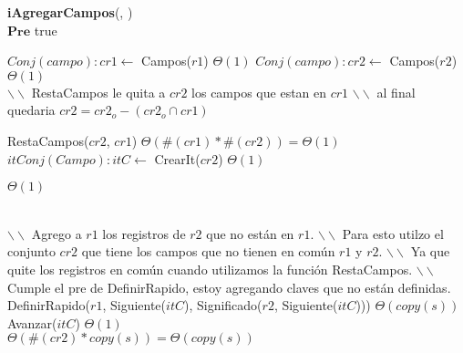\begin{algorithm}[H]{{\textbf{iAgregarCampos}(, )}}
	{\\ $\textbf{Pre}$ true}
    	\begin{algorithmic}[1]

    		\State $Conj(campo): cr1 \gets$ Campos($r1$) \Comment $\Theta(1)$
    		\State $Conj(campo): cr2 \gets$ Campos($r2$) \Comment $\Theta(1)$
    		\\

			\State $\backslash\backslash$ RestaCampos le quita a $cr2$ los campos que estan en $cr1$
			\State $\backslash\backslash$ al final quedaria $cr2 = cr2_o - (cr2_o \cap cr1)$

    		\State RestaCampos($cr2$, $cr1$) \Comment $\Theta(\#(cr1) * \#(cr2)) = \Theta(1)$
    		\\

    		\State $itConj(Campo): itC \gets$ CrearIt($cr2$) \Comment $\Theta(1)$
    	
    		 \Comment $\Theta(1)$

    			\\
    			\State $\backslash\backslash$ Agrego a $r1$ los registros de $r2$ que no están en $r1$.
    			\State $\backslash\backslash$ Para esto utilzo el conjunto $cr2$ que tiene los campos que no tienen en común $r1$ y $r2$.
    			\State $\backslash\backslash$ Ya que quite los registros en común cuando utilizamos la función RestaCampos.
    			\State $\backslash\backslash$ Cumple el pre de DefinirRapido, estoy agregando claves que no están definidas.
    			\State DefinirRapido($r1$, Siguiente($itC$), Significado($r2$, Siguiente($itC$))) \Comment $\Theta(copy(s))$
    			\\
    			
    			\State Avanzar($itC$) \Comment $\Theta(1)$
    			\\
    		\EndWhile 
    		\Comment $\Theta(\#(cr2)*copy(s)) = \Theta(copy(s))$
		

\end{algorithmic}
\end{algorithm}

